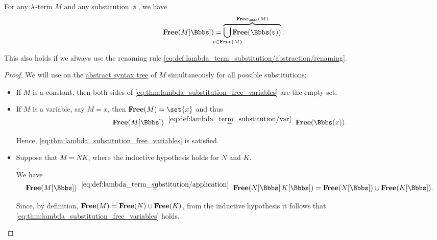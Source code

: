 \begin{proposition}\label{thm:lambda_substitution_free_variables}
  For any \( {\mathrm \lambda} \)-term \( M \) and any substitution \( \Bbbs \), we have
  \begin{equation}\label{eq:thm:lambda_substitution_free_variables}
    \op*{Free}( M[\Bbbs] ) = \overbrace{\bigcup_{\mathclap{v \in \op*{Free}(M)}} \op*{Free}(\Bbbs(v))}^{\op*{Free}_\Bbbs(M)}.
  \end{equation}

  This also holds if we always use the renaming rule \eqref{eq:def:lambda_term_substitution/abstraction/renaming}.
\end{proposition}
\begin{proof}
  We will use  on the \hyperref[def:lambda_term_ast]{abstract syntax tree} of \( M \) simultaneously for all possible substitutions:
  \begin{itemize}
    \item If \( M \) is a constant, then both sides of \eqref{eq:thm:lambda_substitution_free_variables} are the empty set.

    \item If \( M \) is a variable, say \( M = x \), then \( \op*{Free}(M) = \set{ x } \) and thus
    \begin{equation*}
      \op*{Free}(M[\Bbbs])
      \reloset {\eqref{eq:def:lambda_term_substitution/var}} =
      \op*{Free}(\Bbbs(x)).
    \end{equation*}

    Hence, \eqref{eq:thm:lambda_substitution_free_variables} is satisfied.

    \item Suppose that \( M = NK \), where the inductive hypothesis holds for \( N \) and \( K \).

    We have
    \begin{equation*}
      \op*{Free}(M[\Bbbs])
      \reloset {\eqref{eq:def:lambda_term_substitution/application}} =
      \op*{Free}(N[\Bbbs] \thinspace K[\Bbbs])
      =
      \op*{Free}(N[\Bbbs]) \cup \op*{Free}(K[\Bbbs]).
    \end{equation*}

    Since, by definition, \( \op*{Free}(M) = \op*{Free}(N) \cup \op*{Free}(K) \), from the inductive hypothesis it follows that \eqref{eq:thm:lambda_substitution_free_variables} holds.


\end{itemize}
\end{proof}
